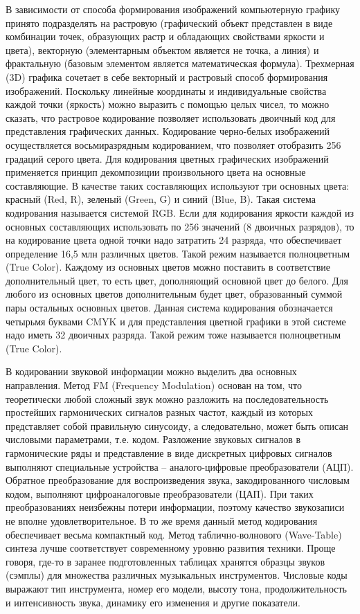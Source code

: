 \documentclass{ou}
\begin{document}
В зависимости от способа формирования изображений компьютерную графику принято подразделять на растровую (графический объект представлен в виде комбинации точек, образующих растр и обладающих свойствами яркости и цвета), векторную (элементарным объектом является не точка, а линия) и фрактальную (базовым элементом является математическая формула). Трехмерная (3D) графика сочетает в себе векторный и растровый способ формирования изображений. Поскольку линейные координаты и индивидуальные свойства каждой точки (яркость) можно выразить с помощью целых чисел, то можно сказать, что растровое кодирование позволяет использовать двоичный код для представления графических данных. Кодирование черно-белых изображений осуществляется восьмиразрядным кодированием, что позволяет отобразить 256 градаций серого цвета. Для кодирования цветных графических изображений применяется принцип декомпозиции произвольного цвета на основные составляющие. В качестве таких составляющих используют три основных цвета: красный (Red, R), зеленый (Green, G) и синий (Blue, B). Такая система кодирования называется системой RGB. Если для кодирования яркости каждой из основных составляющих использовать по 256 значений (8 двоичных разрядов), то на кодирование цвета одной точки надо затратить 24 разряда, что обеспечивает определение 16,5 млн различных цветов. Такой режим называется полноцветным (True Color). Каждому из основных цветов можно поставить в соответствие дополнительный цвет, то есть цвет, дополняющий основной цвет до белого. Для любого из основных цветов дополнительным будет цвет, образованный суммой пары остальных основных цветов. Данная система кодирования обозначается четырьмя буквами CMYK и для представления цветной графики в этой системе надо иметь 32 двоичных разряда. Такой режим тоже называется полноцветным (True Color). 

В кодировании звуковой информации можно выделить два основных направления. Метод FM (Frequency Modulation) основан на том, что теоретически любой сложный звук можно разложить на последовательность простейших гармонических сигналов разных частот, каждый из которых представляет собой правильную синусоиду, а следовательно, может быть описан числовыми параметрами, т.е. кодом. Разложение звуковых сигналов в гармонические ряды и представление в виде дискретных цифровых сигналов выполняют специальные устройства -- аналого-цифровые преобразователи (АЦП). Обратное преобразование для воспроизведения звука, закодированного числовым кодом, выполняют цифроаналоговые преобразователи (ЦАП). При таких преобразованиях неизбежны потери информации, поэтому качество звукозаписи не вполне удовлетворительное. В то же время данный метод кодирования обеспечивает весьма компактный код. Метод таблично-волнового (Wave-Table) синтеза лучше соответствует современному уровню развития техники. Проще говоря, где-то в заранее подготовленных таблицах хранятся образцы звуков (сэмплы) для множества различных музыкальных инструментов. Числовые коды выражают тип инструмента, номер его модели, высоту тона, продолжительность и интенсивность звука, динамику его изменения и другие показатели.
\newpage
\end{document}
